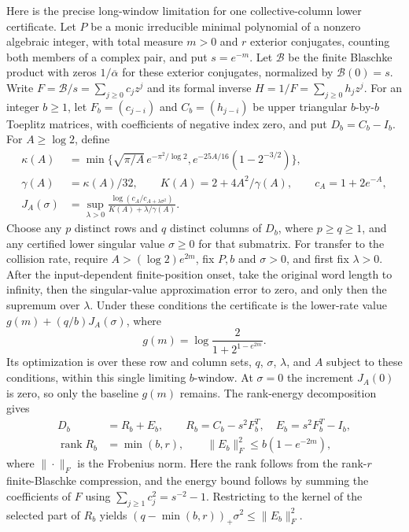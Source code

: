 Here is the precise long-window limitation for one collective-column lower certificate.
Let $P$ be a monic irreducible minimal polynomial of a nonzero algebraic integer, with total measure $m>0$ and $r$ exterior conjugates, counting both members of a complex pair, and put $s=e^{-m}$.
Let $\mathcal B$ be the finite Blaschke product with zeros $1/\overline\alpha$ for these exterior conjugates, normalized by $\mathcal B(0)=s$.
Write $F=\mathcal B/s=\sum_{j\ge0}c_jz^j$ and its formal inverse $H=1/F=\sum_{j\ge0}h_jz^j$.
For an integer $b\ge1$, let $F_b=(c_{j-i})$ and $C_b=(h_{j-i})$ be upper triangular $b$-by-$b$ Toeplitz matrices, with coefficients of negative index zero, and put $D_b=C_b-I_b$.
For $A\ge\log2$, define
\[
 \begin{split}
 \kappa(A)&=\min\{\sqrt{\pi/A}\,e^{-\pi^2/\log2},
                         e^{-25A/16}(1-2^{-3/2})\},\\
 \gamma(A)&=\kappa(A)/32,\qquad K(A)=2+4A^2/\gamma(A),
       \qquad c_A=1+2e^{-A},\\
 J_A(\sigma)&=\sup_{\lambda>0}
  \frac{\log(c_A/c_{A+\lambda\sigma^2})}
       {K(A)+\lambda/\gamma(A)}.
 \end{split}
\]
Choose any $p$ distinct rows and $q$ distinct columns of $D_b$, where $p\ge q\ge1$, and any certified lower singular value $\sigma\ge0$ for that submatrix.
For transfer to the collision rate, require $A>(\log2)e^{2m}$, fix $P,b$ and $\sigma>0$, and first fix $\lambda>0$.
After the input-dependent finite-position onset, take the original word length to infinity, then the singular-value approximation error to zero, and only then the supremum over $\lambda$.
Under these conditions the certificate is the lower-rate value $g(m)+(q/b)J_A(\sigma)$, where
\[
 g(m)=\log\frac{2}{1+2^{1-e^{2m}}}.
\]
Its optimization is over these row and column sets, $q$, $\sigma$, $\lambda$, and $A$ subject to these conditions, within this single limiting $b$-window.
At $\sigma=0$ the increment $J_A(0)$ is zero, so only the baseline $g(m)$ remains.
The rank-energy decomposition gives
\[
 \begin{split}
 D_b&=R_b+E_b,\qquad R_b=C_b-s^2F_b^T,\quad E_b=s^2F_b^T-I_b,\\
 \operatorname{rank}R_b&=\min(b,r),\qquad
 \|E_b\|_F^2\le b(1-e^{-2m}),
 \end{split}
\]
where $\|\cdot\|_F$ is the Frobenius norm.
Here the rank follows from the rank-$r$ finite-Blaschke compression, and the energy bound follows by summing the coefficients of $F$ using $\sum_{j\ge1}c_j^2=s^{-2}-1$.
Restricting to the kernel of the selected part of $R_b$ yields $(q-\min(b,r))_+\sigma^2\le\|E_b\|_F^2$.

